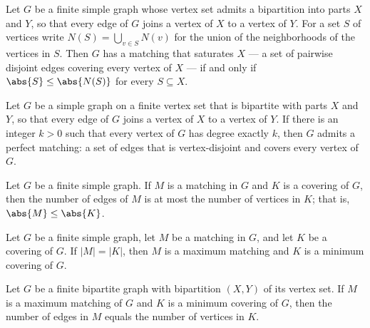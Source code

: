 \begin{theorem}
\label{SimpleGraph.hall_bipartite_matching}
Let $G$ be a finite simple graph whose vertex set admits a bipartition into parts $X$
and $Y$, so that every edge of $G$ joins a vertex of $X$ to a vertex of $Y$. For a set
$S$ of vertices write $N(S) = \bigcup_{v \in S} N(v)$ for the union of the neighborhoods
of the vertices in $S$. Then $G$ has a matching that saturates $X$ — a set of pairwise
disjoint edges covering every vertex of $X$ — if and only if $\abs{S} \le \abs{N(S)}$
for every $S \subseteq X$.
\end{theorem}

\begin{theorem}
\label{SimpleGraph.marriage_theorem}
Let $G$ be a simple graph on a finite vertex set that is bipartite with parts $X$ and
$Y$, so that every edge of $G$ joins a vertex of $X$ to a vertex of $Y$. If there is an
integer $k > 0$ such that every vertex of $G$ has degree exactly $k$, then $G$ admits a
perfect matching: a set of edges that is vertex-disjoint and covers every vertex of $G$.
\end{theorem}

\begin{theorem}
\label{SimpleGraph.matching_card_le_covering_card}
Let $G$ be a finite simple graph. If $M$ is a matching in $G$ and $K$ is a covering of
$G$, then the number of edges of $M$ is at most the number of vertices in $K$; that is,
$\abs{M} \le \abs{K}$.
\end{theorem}

\begin{theorem}
\label{SimpleGraph.isMaximumMatching_and_isMinimumCovering_of_card_eq}
Let $G$ be a finite simple graph, let $M$ be a matching in $G$, and let $K$ be a
covering of $G$. If $|M| = |K|$, then $M$ is a maximum matching and $K$ is a minimum
covering of $G$.
\end{theorem}

\begin{theorem}
\label{SimpleGraph.konig_matching_covering}
Let $G$ be a finite bipartite graph with bipartition $(X, Y)$ of its vertex set. If $M$
is a maximum matching of $G$ and $K$ is a minimum covering of $G$, then the number of
edges in $M$ equals the number of vertices in $K$.
\end{theorem}

